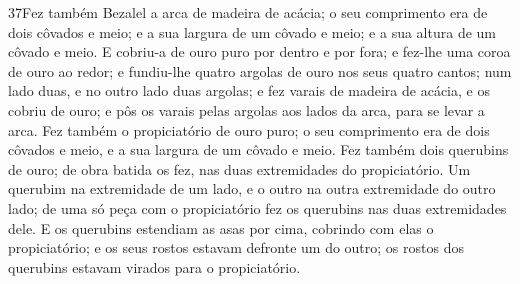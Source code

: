 \medskip

\lettrine{37} Fez também Bezalel a arca de madeira de acácia;
o seu comprimento era de dois côvados e meio; e a sua largura de um
côvado e meio; e a sua altura de um côvado e meio. E cobriu-a de
ouro puro por dentro e por fora; e fez-lhe uma coroa de ouro ao
redor; e fundiu-lhe quatro argolas de ouro nos seus quatro
cantos; num lado duas, e no outro lado duas argolas; e fez
varais de madeira de acácia, e os cobriu de ouro; e pôs os
varais pelas argolas aos lados da arca, para se levar a arca.
Fez também o propiciatório de ouro puro; o seu comprimento era
de dois côvados e meio, e a sua largura de um côvado e meio. Fez
também dois querubins de ouro; de obra batida os fez, nas duas
extremidades do propiciatório. Um querubim na extremidade de um
lado, e o outro na outra extremidade do outro lado; de uma só peça
com o propiciatório fez os querubins nas duas extremidades dele.
E os querubins estendiam as asas por cima, cobrindo com elas o
propiciatório; e os seus rostos estavam defronte um do outro; os
rostos dos querubins estavam virados para o propiciatório.

